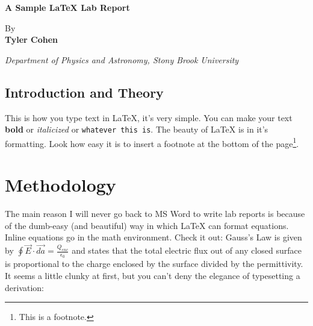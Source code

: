 \begin{titlepage}

\begin{minipage}{1in}
\begin{tabular}{l}
\end{tabular}
\end{minipage}
\hfill
\begin{minipage}{1in}
\begin{tabular}{r}
\end{tabular}
\end{minipage}


\begin{center}

{ \huge \textbf{A Sample \LaTeX\; Lab Report} }\\[0.4cm]
\begin{center}
\vspace{2cm}
By\\
\large\textbf{Tyler Cohen}
\end{center}

\begin{center}
\textit{\textmd{Department of Physics and Astronomy, Stony Brook University}}\\
\vspace{1cm}
\end{center}
\end{center}


\end{titlepage}



\begin{flushleft}
\section{Introduction and Theory}
\end{flushleft}
\par This is how you type text in \LaTeX, it's very simple. You can make your 
text \textbf{bold} or \textit{italicized} or \texttt{whatever this is}. The 
beauty of \LaTeX\: is in it's formatting. Look how easy it is to insert a 
footnote at the bottom of the page\footnote{This is a footnote.}.
\bigskip

\section{Methodology}
\par The main reason I will never go back to MS Word to write lab reports is 
because of the dumb-easy (and beautiful) way in which \LaTeX \: can format 
equations. Inline equations go in the math environment. Check it out: Gauss's 
Law is given by $\oint \vec{E} \cdot \vec{da} = \frac{Q_{enc}}{\epsilon_{0}}$ 
and states that the total electric flux out of any closed surface is proportional 
to the charge enclosed by the surface divided by the permittivity. It seems a 
little clunky at first, but you can't deny the elegance of typesetting a derivation:

